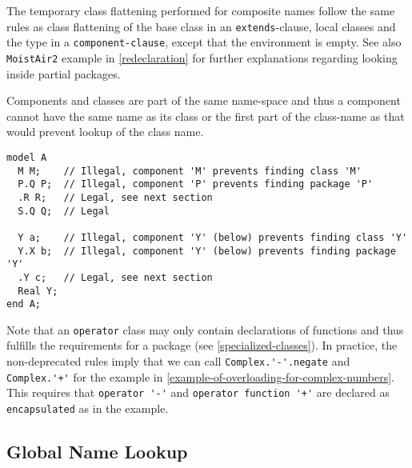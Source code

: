 \begin{nonnormative}
The temporary class flattening performed for composite names follow the same rules as class flattening of the base class in an \lstinline!extends!-clause, local classes and the type in a \lstinline[language=grammar]!component-clause!, except that the environment is empty.
See also \lstinline!MoistAir2! example in \cref{redeclaration} for further explanations regarding looking inside partial packages.
\end{nonnormative}
\begin{example}
Components and classes are part of the same name-space and thus a component cannot have the same name as its class or the first part of the class-name as that would prevent lookup of the class name.
\begin{lstlisting}[language=modelica]
model A
  M M;    // Illegal, component 'M' prevents finding class 'M'
  P.Q P;  // Illegal, component 'P' prevents finding package 'P'
  .R R;   // Legal, see next section
  S.Q Q;  // Legal

  Y a;    // Illegal, component 'Y' (below) prevents finding class 'Y'
  Y.X b;  // Illegal, component 'Y' (below) prevents finding package 'Y'
  .Y c;   // Legal, see next section
  Real Y;
end A;
\end{lstlisting}
\end{example}

\begin{nonnormative}
Note that an \lstinline!operator! class may only contain declarations of functions and thus fulfills the requirements for a package (see \cref{specialized-classes}).
In practice, the non-deprecated rules imply that we can call \lstinline!Complex.'-'.negate! and \lstinline!Complex.'+'! for the example in \cref{example-of-overloading-for-complex-numbers}.
This requires that \lstinline!operator '-'! and \lstinline!operator function '+'! are declared as \lstinline!encapsulated! as in the example.
\end{nonnormative}


\subsection{Global Name Lookup}\label{global-name-lookup}

